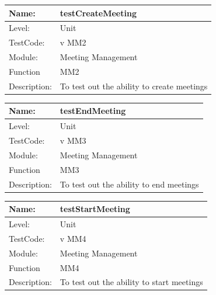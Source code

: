 \documentclass[12pt]{article}
\begin{document}
\begin{center}
\begin{tabular}{|l|p{12cm}|}
\hline

 Name: & testCreateMeeting  \\
\hline
Level: & Unit \\
\hline
TestCode: & v MM2 \\
\hline
Module:& Meeting Management \\
\hline
Function & MM2 \\
\hline
Description: & To test out the ability to create meetings \\
\hline

\end{tabular}
\end{center}

\begin{center}
\begin{tabular}{|l|p{12cm}|}
\hline

 Name: & testEndMeeting  \\
\hline
Level: & Unit \\
\hline
TestCode: & v MM3 \\
\hline
Module:& Meeting Management \\
\hline
Function & MM3 \\
\hline
Description: & To test out the ability to end meetings   \\
\hline

\end{tabular}
\end{center}

\begin{center}
\begin{tabular}{|l|p{12cm}|}
\hline

 Name: & testStartMeeting  \\
\hline
Level: & Unit \\
\hline
TestCode: & v MM4 \\
\hline
Module:& Meeting Management \\
\hline
Function & MM4 \\
\hline
Description: & To test out the ability to start meetings  \\
\hline

\end{tabular}
\end{center}
\end{document}
